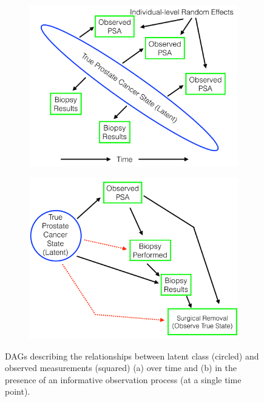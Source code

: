 \documentclass[12pt, letterpaper]{article}
\begin{document}
\begin{figure}
\begin{center}
\begin{subfigure}[b]{0.45\textwidth}
\includegraphics[width=\textwidth]{dag2}
\caption{}%
\label{fig:dag2}
\end{subfigure}
\begin{subfigure}[b]{0.45\textwidth}
\includegraphics[width=\textwidth]{dag3}
\caption{}%
\label{fig:dag3}
\end{subfigure}
\caption{DAGs describing the relationships between latent class (circled) and observed measurements (squared) (a) over time and (b) in the presence of an informative observation process (at a single time point).}
\end{center}
\end{figure}
\end{document}
